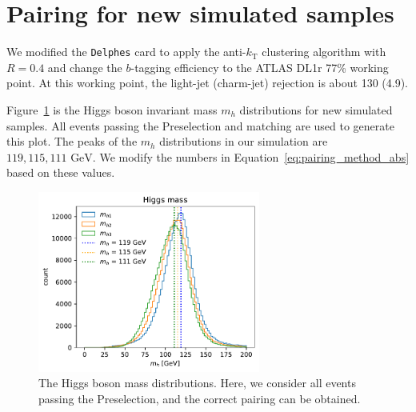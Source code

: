 \documentclass[12pt]{article}
\begin{document}
\section{Pairing for new simulated samples}%
\label{sec:pairing_for_new_simulated_samples}
    We modified the \verb|Delphes| card to apply the anti-$k_{\text{T}}$ clustering algorithm with $R = 0.4$ and change the $b$-tagging efficiency to the ATLAS DL1r 77\% working point. At this working point, the light-jet (charm-jet) rejection is about 130 (4.9).

    Figure~\ref{fig:mh_distribution_new} is the Higgs boson invariant mass $m_h$ distributions for new simulated samples. All events passing the Preselection and matching are used to generate this plot. The peaks of the $m_{h}$ distributions in our simulation are $119, 115, 111 \text{ GeV}$. We modify the numbers in Equation~\ref{eq:pairing_method_abs} based on these values.
	\begin{figure}[htpb] 
		\centering
        \includegraphics[width=0.65\textwidth]{mh_distribution_new.pdf}
		\caption{The Higgs boson mass distributions. Here, we consider all events passing the Preselection, and the correct pairing can be obtained.}
		\label{fig:mh_distribution_new}
	\end{figure}
\end{document}
